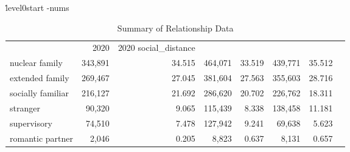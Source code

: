 \begin{table}
\centering
\caption{Summary of Relationship Data}
\.level0start
\tabular-nums
\begin{tabular}{lrrrrrr}
 & 2020 & 2020 %
social_distance &  &  &  &  &  &  \\
nuclear family & 343,891 & 34.515 & 464,071 & 33.519 & 439,771 & 35.512 \\
extended family & 269,467 & 27.045 & 381,604 & 27.563 & 355,603 & 28.716 \\
socially familiar & 216,127 & 21.692 & 286,620 & 20.702 & 226,762 & 18.311 \\
stranger & 90,320 & 9.065 & 115,439 & 8.338 & 138,458 & 11.181 \\
supervisory & 74,510 & 7.478 & 127,942 & 9.241 & 69,638 & 5.623 \\
romantic partner & 2,046 & 0.205 & 8,823 & 0.637 & 8,131 & 0.657 \\
\end{tabular}
\end{table}

